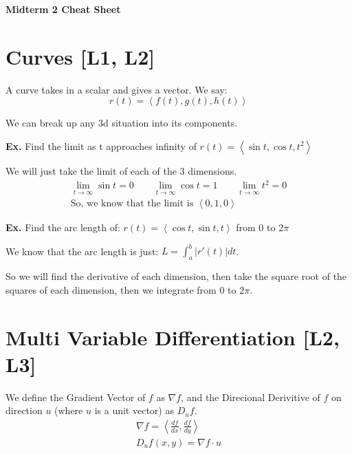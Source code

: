 \documentclass[12pt,letterpaper]{article} \usepackage{amsmath} \usepackage{graphicx} \usepackage[margin=1in]{geometry} \usepackage{longtable}  \usepackage{amssymb}
\begin{document}
	
	\begin{center}
		\Large\textbf{Midterm 2 Cheat Sheet} \\
		\vspace{0.5em}
	\end{center}
	
	\section{Curves [L1, L2]}
	A curve takes in a scalar and gives a vector. We say:
	\begin{equation*}
		r(t)=\left<f(t),g(t),h(t)\right>
	\end{equation*}

	We can break up any 3d situation into its components. 
	
	\begin{mdframed}[]
		\textbf{Ex. } Find the limit as t approaches infinity of $r(t)=\left<\sin t, \cos t, t^2\right>$
	
	We will just take the limit of each of the 3 dimensions. 
	\begin{align*}
		\lim_{t\to\infty} \sin t = 0 \qquad \lim_{t\to\infty} \cos t = 1 \qquad \lim_{t\to\infty} t^2 = 0 \\
    	\text{So, we know that the limit is } \left<0,1,0\right>
	\end{align*}
	\end{mdframed}

	\begin{mdframed}[]
		\textbf{Ex. } Find the arc length of: $r(t) = \left<\cos t, \sin t, t\right>$ from 0 to $2\pi$
		
		We know that the arc length is just: $L = \int_a^{b} |r'(t)|dt$.
		
		So we will find the derivative of each dimension, then take the square root of the squares of each dimension, then we integrate from 0 to $2\pi$.
	\end{mdframed}
	
	\section{Multi Variable Differentiation [L2, L3]}
	We define the Gradient Vector of $f$ as $\nabla f$, and the Direcional Derivitive of $f$ on direction $u$ (where $u$ is a unit vector) as $D_u f$.
	\begin{align*}
		\nabla f = \left<\frac{df}{dx},\frac{df}{dy}\right> \\
		D_u f(x,y) = \nabla f \cdot u
	\end{align*}
\end{document}
